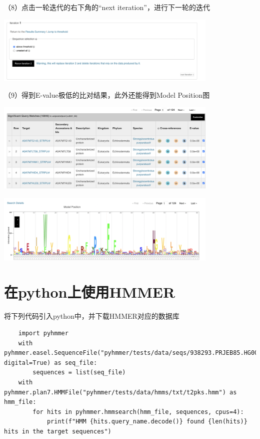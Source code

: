 （8）点击一轮迭代的右下角的“next iteration”，进行下一轮的迭代

\includegraphics[width=0.8\textwidth]{./image/gdk/7.4.9.png}

（9）得到E-value极低的比对结果，此外还能得到Model Position图

\includegraphics[width=0.8\textwidth]{./image/gdk/7.4.10.png}

\includegraphics[width=0.8\textwidth]{./image/gdk/7.4.11.png}

\section{在python上使用HMMER}

将下列代码引入python中，并下载HMMER对应的数据库

\begin{lstlisting}
    import pyhmmer
    with pyhmmer.easel.SequenceFile("pyhmmer/tests/data/seqs/938293.PRJEB85.HG003687.faa",                                      digital=True) as seq_file:
        sequences = list(seq_file)
    with pyhmmer.plan7.HMMFile("pyhmmer/tests/data/hmms/txt/t2pks.hmm") as hmm_file:
        for hits in pyhmmer.hmmsearch(hmm_file, sequences, cpus=4):
            print(f"HMM {hits.query_name.decode()} found {len(hits)} hits in the target sequences")

\end{lstlisting}